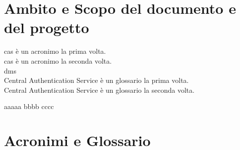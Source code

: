 \documentclass[12pt,a4paper,oneside]{article} %
\begin{document}
\thispagestyle{empty}
\newpage %

\tableofcontents
\appendix
\printindex %
\newpage %




\section{Ambito e Scopo del documento e del progetto}

\gls{cas} è un acronimo la prima volta.\\
\gls{cas} è un acronimo la seconda volta.\\
\gls{dms}\\
\gls{Central Authentication Service} è un glossario la prima volta.\\
\gls{Central Authentication Service} è un glossario la seconda volta.

aaaaa \cite{esp1} bbbb \cite{esp1} cccc

\newpage %

	
\section{Acronimi e Glossario}

\renewcommand*{\glossaryname}{Glossario}
\renewcommand*{\acronymname}{Acronimi}





\printglossary[numberedsection,type=acronym]
\printglossary[numberedsection]

\newpage %

\end{document}
